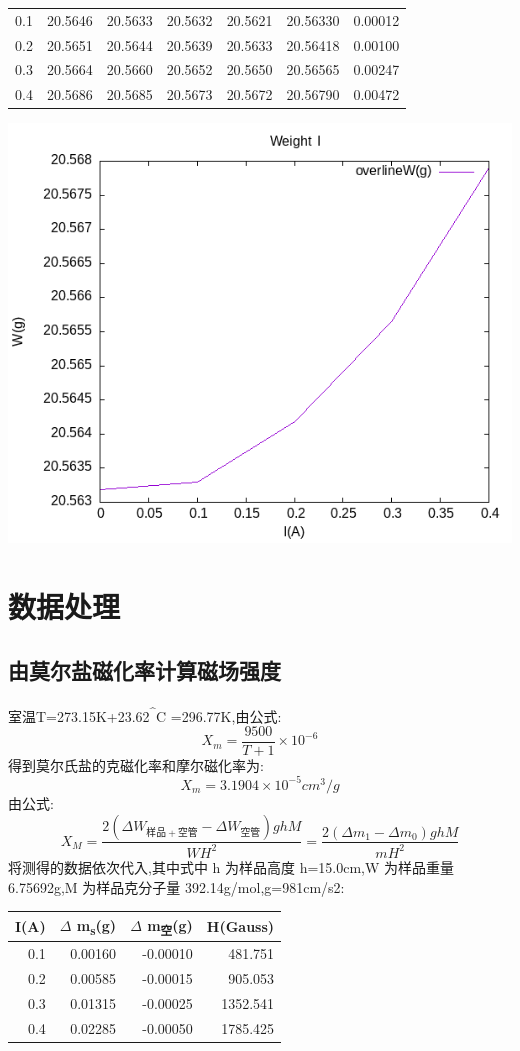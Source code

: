 \documentclass[11pt]{report}
\begin{document}
\begin{enumerate}
\begin{center}
\begin{tabular}{rrrrrrr}
0.1 & 20.5646 & 20.5633 & 20.5632 & 20.5621 & 20.56330 & 0.00012\\
0.2 & 20.5651 & 20.5644 & 20.5639 & 20.5633 & 20.56418 & 0.00100\\
0.3 & 20.5664 & 20.5660 & 20.5652 & 20.5650 & 20.56565 & 0.00247\\
0.4 & 20.5686 & 20.5685 & 20.5673 & 20.5672 & 20.56790 & 0.00472\\
\end{tabular}
\end{center}
\begin{center}
\includegraphics[width=.9\linewidth]{../img/3-3.png}
\end{center}
\end{enumerate}
\chapter{数据处理}
\label{sec:orgbb7fc1b}
\section{由莫尔盐磁化率计算磁场强度}
\label{sec:org256244c}
室温T=273.15K+23.62\textsuperscript{\^{}}C =296.77K,由公式:
\[
X_{m}=\frac{9500}{T+1}\times 10^{-6}
\]
得到莫尔氏盐的克磁化率和摩尔磁化率为:
\[
X_{m}=3.1904\times 10^{-5}cm^{3}/g
\]
由公式:
\[
X_{M}=\frac{2(\Delta W_{样品+空管}-\Delta W_{空管})ghM}{WH^{2}}=\frac{2(\Delta m_{1}-\Delta m_{0})ghM}{mH^{2}}
\]
将测得的数据依次代入,其中式中 h 为样品高度 h=15.0cm,W 为样品重量 6.75692g,M 为样品克分子量 392.14g/mol,g=981cm/s2:
\begin{center}
\begin{tabular}{rrrr}
I(A) & \(\Delta\) m\textsubscript{s}(g) & \(\Delta\) m\textsubscript{空}(g) & H(Gauss)\\
\hline
0.1 & 0.00160 & -0.00010 & 481.751\\
0.2 & 0.00585 & -0.00015 & 905.053\\
0.3 & 0.01315 & -0.00025 & 1352.541\\
0.4 & 0.02285 & -0.00050 & 1785.425\\
\end{tabular}
\end{center}
\end{document}
